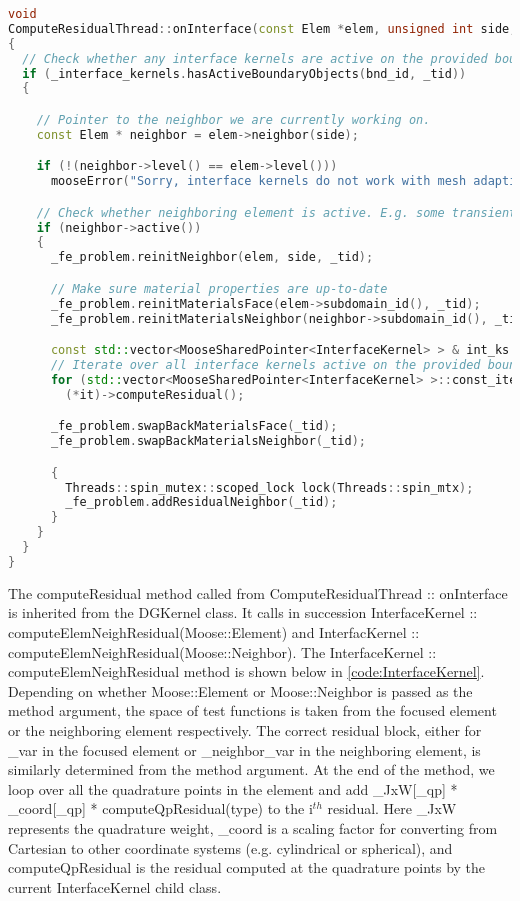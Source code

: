 \begin{lstlisting}[language = C++, caption = ComputeResidualThread::onInterface method. The logic is much the same for the ComputeJacobianThread::onInterface method. , label = code:ComputeResidualThread]
void
ComputeResidualThread::onInterface(const Elem *elem, unsigned int side, BoundaryID bnd_id)
{
  // Check whether any interface kernels are active on the provided boundary ID
  if (_interface_kernels.hasActiveBoundaryObjects(bnd_id, _tid))
  {

    // Pointer to the neighbor we are currently working on.
    const Elem * neighbor = elem->neighbor(side);

    if (!(neighbor->level() == elem->level()))
      mooseError("Sorry, interface kernels do not work with mesh adaptivity");

    // Check whether neighboring element is active. E.g. some transient simulations may not simulate all of the subdomains for all time steps
    if (neighbor->active())
    {
      _fe_problem.reinitNeighbor(elem, side, _tid);

      // Make sure material properties are up-to-date
      _fe_problem.reinitMaterialsFace(elem->subdomain_id(), _tid);
      _fe_problem.reinitMaterialsNeighbor(neighbor->subdomain_id(), _tid);

      const std::vector<MooseSharedPointer<InterfaceKernel> > & int_ks = _interface_kernels.getActiveBoundaryObjects(bnd_id, _tid);
      // Iterate over all interface kernels active on the provided boundary ID and compute the corresponding residuals
      for (std::vector<MooseSharedPointer<InterfaceKernel> >::const_iterator it = int_ks.begin(); it != int_ks.end(); ++it)
        (*it)->computeResidual();

      _fe_problem.swapBackMaterialsFace(_tid);
      _fe_problem.swapBackMaterialsNeighbor(_tid);

      {
        Threads::spin_mutex::scoped_lock lock(Threads::spin_mtx);
        _fe_problem.addResidualNeighbor(_tid);
      }
    }
  }
}
\end{lstlisting}

The computeResidual method called from ComputeResidualThread :: onInterface is inherited from the DGKernel class. It calls in succession InterfaceKernel :: computeElemNeighResidual(Moose::Element) and InterfacKernel :: computeElemNeighResidual(Moose::Neighbor). The InterfaceKernel :: computeElemNeighResidual method is shown below in \cref{code:InterfaceKernel}. Depending on whether Moose::Element or Moose::Neighbor is passed as the method argument, the space of test functions is taken from the focused element or the neighboring element respectively. The correct residual block, either for \_var in the focused element or \_neighbor\_var in the neighboring element, is similarly determined from the method argument. At the end of the method, we loop over all the quadrature points in the element and add \_JxW[\_qp] * \_coord[\_qp] * computeQpResidual(type) to the i$^{th}$ residual. Here \_JxW represents the quadrature weight, \_coord is a scaling factor for converting from Cartesian to other coordinate systems (e.g. cylindrical or spherical), and computeQpResidual is the residual computed at the quadrature points by the current InterfaceKernel child class.

